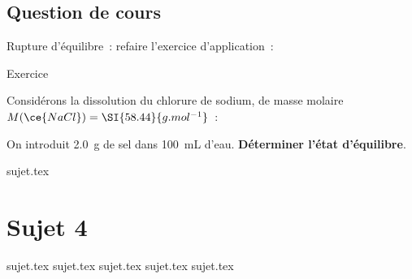 \documentclass[a4paper, 11pt]{book}
\begin{document}
\section{Question de cours}

Rupture d'équilibre~: refaire l'exercice d'application~:
\begin{NCexem}[width=\linewidth]{Exercice}

    Considérons la dissolution du chlorure de sodium, de masse molaire
    $M(\ce{NaCl}) = \SI{58.44}{g.mol^{-1}}$~:


    On introduit \SI{2.0}{g} de sel dans \SI{100}{mL} d'eau. \textbf{Déterminer
    l'état d'équilibre}.
\end{NCexem}

\resetQ
{sujet.tex}

\newpage
\chapter{Sujet 4}

\resetQ
{sujet.tex}
\resetQ
{sujet.tex}
\resetQ
{sujet.tex}
\resetQ
{sujet.tex}
\resetQ
{sujet.tex}
\end{document}
